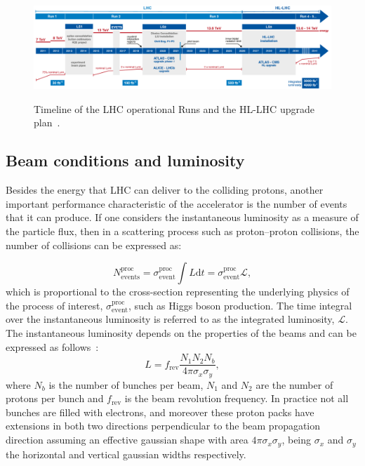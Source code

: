 \begin{figure}[htbp]
    \centering
    \includegraphics[width=1\linewidth]{images/HL-LHC_Plan_January2025}\\
    \caption{Timeline of the LHC operational Runs and the HL-LHC upgrade plan~\cite{HL-LHC_plans}.}
    \label{fig:LHC-HL}
\end{figure}


\subsection{Beam conditions and luminosity}

Besides the energy that LHC can deliver to the colliding protons, another important performance characteristic of the accelerator is the number of events that it can produce. If one considers the instantaneous luminosity as a measure of the particle flux, then in a scattering process such as proton--proton collisions, the number of collisions can be expressed as:

\begin{equation}
  N^{\text{proc}}_\text{{events}} = \sigma^{\text{proc}}_{\text{event}} \int L\text{d}t = \sigma^{\text{proc}}_{\text{event}}\mathcal{L},
\end{equation}
which is proportional to the cross-section representing the underlying physics of the process of interest, $\sigma^{\text{proc}}_{\text{event}}$, such as Higgs boson production. The time integral over the instantaneous luminosity is referred to as the integrated luminosity, $\mathcal{L}$. The instantaneous luminosity depends on the properties of the beams and can be expressed as follows~\cite{Aad_2023}:
\begin{equation}
    L = f_{\text{rev}}\frac{N_1 N_2 N_b}{4\pi \sigma_x \sigma_y},
\end{equation}
where $N_b$ is the number of bunches per beam, $N_1$ and $N_2$ are the number of protons per bunch and $f_{\text{rev}}$ is the beam revolution frequency. In practice not all bunches are filled with electrons, and moreover these proton packs have extensions in both two directions perpendicular to the beam propagation direction assuming an effective gaussian shape with area $4\pi\sigma_{x}\sigma_{y}$, being $\sigma_{x}$ and $\sigma_{y}$ the horizontal and vertical gaussian widths respectively.  

